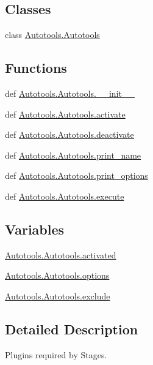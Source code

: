 \subsection*{Classes}
\begin{DoxyCompactItemize}
\item 
class \hyperlink{class_autotools_1_1_autotools}{Autotools.\-Autotools}
\end{DoxyCompactItemize}
\subsection*{Functions}
\begin{DoxyCompactItemize}
\item 
def \hyperlink{group___tools_ga5b5ac092ad7f4bc45bf785633c8be95a}{Autotools.\-Autotools.\-\_\-\-\_\-init\-\_\-\-\_\-}
\item 
def \hyperlink{group___tools_ga202b0e727db575d20a381cd039dd3597}{Autotools.\-Autotools.\-activate}
\item 
def \hyperlink{group___tools_ga74513a2f4135b506e66c047559f9571e}{Autotools.\-Autotools.\-deactivate}
\item 
def \hyperlink{group___tools_ga0873459245ef2255a5a7386957fa592e}{Autotools.\-Autotools.\-print\-\_\-name}
\item 
def \hyperlink{group___tools_ga41481e9f2a7e7fce32f51cc8feb909fd}{Autotools.\-Autotools.\-print\-\_\-options}
\item 
def \hyperlink{group___tools_ga5ae85e70e9e6252f4be23ef60624f633}{Autotools.\-Autotools.\-execute}
\end{DoxyCompactItemize}
\subsection*{Variables}
\begin{DoxyCompactItemize}
\item 
\hyperlink{group___tools_ga6bbb714a91bc8b6fe749326772b073b3}{Autotools.\-Autotools.\-activated}
\item 
\hyperlink{group___tools_ga8b348e19f0a7104bde9c43c3a6ed695d}{Autotools.\-Autotools.\-options}
\item 
\hyperlink{group___tools_gaee37d9789ea22ee310ebc357cd721b7f}{Autotools.\-Autotools.\-exclude}
\end{DoxyCompactItemize}


\subsection{Detailed Description}
Plugins required by Stages. 

